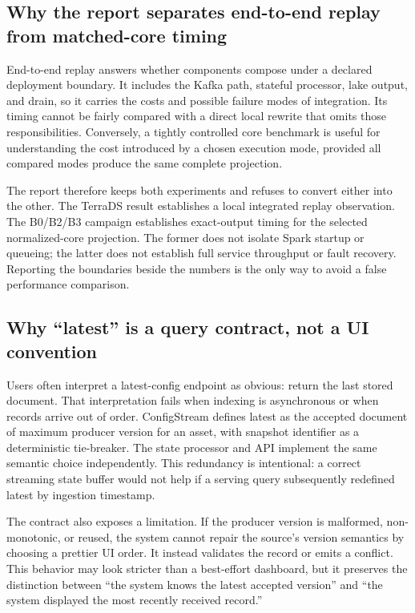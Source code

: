 \documentclass[a4paper,11pt]{article}
\begin{document}
\subsection{Why the report separates end-to-end replay from matched-core timing}

End-to-end replay answers whether components compose under a declared deployment boundary. It includes the Kafka path, stateful processor, lake output, and drain, so it carries the costs and possible failure modes of integration. Its timing cannot be fairly compared with a direct local rewrite that omits those responsibilities. Conversely, a tightly controlled core benchmark is useful for understanding the cost introduced by a chosen execution mode, provided all compared modes produce the same complete projection.

The report therefore keeps both experiments and refuses to convert either into the other. The TerraDS result establishes a local integrated replay observation. The B0/B2/B3 campaign establishes exact-output timing for the selected normalized-core projection. The former does not isolate Spark startup or queueing; the latter does not establish full service throughput or fault recovery. Reporting the boundaries beside the numbers is the only way to avoid a false performance comparison.

\subsection{Why ``latest'' is a query contract, not a UI convention}

Users often interpret a latest-config endpoint as obvious: return the last stored document. That interpretation fails when indexing is asynchronous or when records arrive out of order. ConfigStream defines latest as the accepted document of maximum producer version for an asset, with snapshot identifier as a deterministic tie-breaker. The state processor and API implement the same semantic choice independently. This redundancy is intentional: a correct streaming state buffer would not help if a serving query subsequently redefined latest by ingestion timestamp.

The contract also exposes a limitation. If the producer version is malformed, non-monotonic, or reused, the system cannot repair the source's version semantics by choosing a prettier UI order. It instead validates the record or emits a conflict. This behavior may look stricter than a best-effort dashboard, but it preserves the distinction between ``the system knows the latest accepted version'' and ``the system displayed the most recently received record.''
\end{document}
